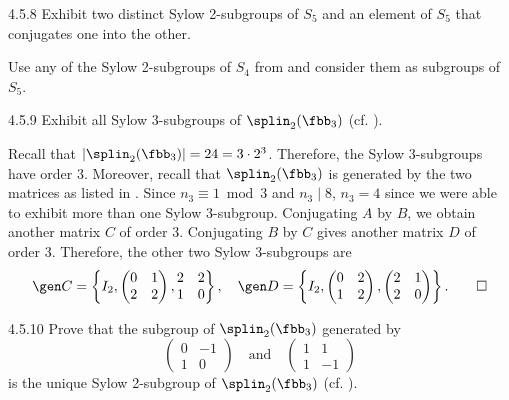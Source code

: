 \begin{exercise}{4.5.8}
	Exhibit two distinct Sylow 2-subgroups of $S_5$ and an element of $S_5$ that conjugates one into the other.
\end{exercise}

\begin{sol}
	Use any of the Sylow 2-subgroups of $S_4$ from  and consider them as subgroups of $S_5$.
\end{sol}

\begin{exercise}{4.5.9}
	Exhibit all Sylow 3-subgroups of $\splin_2(\fbb_3)$ (cf. ).
\end{exercise}

\begin{sol}
	Recall that $|\splin_2(\fbb_3)| = 24 = 3 \cdot 2^3$.
	Therefore, the Sylow 3-subgroups have order 3.
	Moreover, recall that $\splin_2(\fbb_3)$ is generated by the two matrices as listed in .
	Since $n_3 \equiv 1 \bmod 3$ and $n_3 \mid 8$, $n_3 = 4$ since we were able to exhibit more than one Sylow 3-subgroup.
	Conjugating $A$ by $B$, we obtain another matrix $C$ of order 3.
	Conjugating $B$ by $C$ gives another matrix $D$ of order 3.
	Therefore, the other two Sylow 3-subgroups are 
	\[
		\gen C = \left\{I_2, 
		\begin{pmatrix}
			0 & 1 \\
			2 & 2
		\end{pmatrix}, 
		\begin{matrix}
			2 & 2 \\
			1 & 0
		\end{matrix} \right\}, \quad
		\gen D = \left\{I_2,
		\begin{pmatrix}
			0 & 2 \\
			1 & 2
		\end{pmatrix}, 
		\begin{pmatrix}
			2 & 1 \\
			2 & 0
		\end{pmatrix} \right\}. \qedhere
	\]
\end{sol}

\begin{exercise}{4.5.10}
	Prove that the subgroup of $\splin_2(\fbb_3)$ generated by
	\[
		\begin{pmatrix}
			0 & -1 \\
			1 & 0
		\end{pmatrix} \quad \text{and} \quad
		\begin{pmatrix}
			1 & 1 \\
			1 & -1
		\end{pmatrix}
	\]
	is the unique Sylow 2-subgroup of $\splin_2(\fbb_3)$ (cf. ).
\end{exercise}

